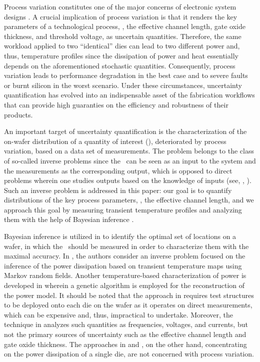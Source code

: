 Process variation constitutes one of the major concerns of electronic system designs \cite{chandrakasan2001, srivastava2010}. A crucial implication of process variation is that it renders the key parameters of a technological process, \eg, the effective channel length, gate oxide thickness, and threshold voltage, as uncertain quantities.
Therefore, the same workload applied to two ``identical'' dies can lead to two different power and, thus, temperature profiles since the dissipation of power and heat essentially depends on the aforementioned stochastic quantities.
Consequently, process variation leads to performance degradation in the best case and to severe faults or burnt silicon in the worst scenario.
Under these circumstances, uncertainty quantification has evolved into an indispensable asset of the fabrication workflows that can provide high guaranties on the efficiency and robustness of their products.

An important target of uncertainty quantification is the characterization of the on-wafer distribution of a quantity of interest (\qoi), deteriorated by process variation, based on a data set of measurements.
The problem belongs to the class of so-called inverse problems since the \qoi\ can be seen as an input to the system and the measurements as the corresponding output, which is opposed to direct problems wherein one studies outputs based on the knowledge of inputs (see, \eg, \cite{juan2011, juan2012}).
Such an inverse problem is addressed in this paper: our goal is to quantify distributions of the key process parameters, \eg, the effective channel length, and we approach this goal by measuring transient temperature profiles and analyzing them with the help of Bayesian inference \cite{gelman2004}.

Bayesian inference is utilized in \cite{zhang2010} to identify the optimal set of locations on a wafer, in which the \qois\ should be measured in order to characterize them with the maximal accuracy.
In \cite{paek2012}, the authors consider an inverse problem focused on the inference of the power dissipation based on transient temperature maps using Markov random fields.
Another temperature-based characterization of power is developed in \cite{mesa-martinez2007} wherein a genetic algorithm is employed for the reconstruction of the power model.
It should be noted that the approach in \cite{zhang2010} requires test structures to be deployed onto each die on the wafer as it operates on direct measurements, which can be expensive and, thus, impractical to undertake.
Moreover, the technique in \cite{zhang2010} analyzes such quantities as frequencies, voltages, and currents, but not the primary sources of uncertainty such as the effective channel length and gate oxide thickness.
The approaches in \cite{paek2012} and \cite{mesa-martinez2007}, on the other hand, concentrating on the power dissipation of a single die, are not concerned with process variation.

